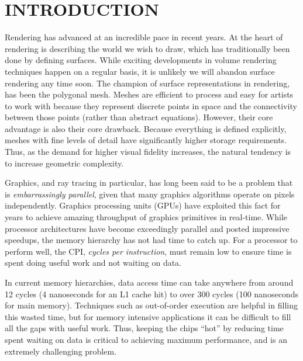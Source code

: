 \documentclass[a4paper,twoside]{article}
\begin{document}
\section{\uppercase{Introduction}}
Rendering has advanced at an incredible pace in recent years. At the heart of
rendering is describing the world we wish to draw, which has traditionally been
done by defining surfaces. While exciting developments in volume rendering
techniques happen on a regular basis, it is unlikely we will abandon surface
rendering any time soon. 
The champion of surface representations in rendering, has been the polygonal
mesh. Meshes are efficient to process and easy for artists to work with because
they represent discrete points in space and the connectivity between those
points (rather than abstract equations). However, their core advantage is also
their core drawback. Because everything is defined explicitly, meshes with fine
levels of detail have significantly higher storage requirements. Thus, as the
demand for higher visual fidelity increases, the natural tendency is to increase
geometric complexity.

Graphics, and ray tracing in particular, has long been said to be a problem that
is \emph{embarrassingly parallel}, given that many graphics algorithms operate
on pixels independently. Graphics processing units (GPUs) have exploited this
fact for years to achieve amazing throughput of graphics primitives in real-time.
While processor architectures have become exceedingly parallel and posted
impressive speedups, the memory hierarchy has not had time to catch up. For a
processor to perform well, the CPI, \emph{cycles per instruction}, must remain
low to ensure time is spent doing useful work and not waiting on data.

In current memory hierarchies, data access time can take anywhere from around
12 cycles (4 nanoseconds for an L1 cache hit) to over 300 cycles (100
nanoseconds for main memory). Techniques such as out-of-order execution are
helpful in filling this wasted time, but for memory intensive applications it
can be difficult to fill all the gaps with useful work. Thus, keeping the chips
``hot'' by reducing time spent waiting on data is critical to achieving maximum
performance, and is an extremely challenging problem.

\end{document}
